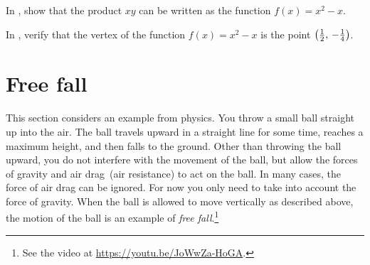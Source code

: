 \documentclass[a4paper,oneside,12pt]{article}
\begin{document}

\begin{exercise}
In , show that the product $xy$ can be
written as the function $f(x) = x^2 - x$.
\end{exercise}


\begin{exercise}
In , verify that the vertex of the
function $f(x) = x^2 - x$ is the point
$\left\lparen{\frac{1}{2}},\, {-\frac{1}{4}}\right\rparen$.
\end{exercise}




\section{Free fall}

This section considers an example from physics.  You throw a small
ball straight up into the air.  The ball travels upward in a straight
line for some time, reaches a maximum height, and then falls to the
ground.  Other than throwing the ball upward, you do not interfere
with the movement of the ball, but allow the forces of gravity and air
drag~(air resistance) to act on the ball.  In many cases, the force of
air drag can be ignored.  For now you only need to take into account
the force of gravity.  When the ball is allowed to move vertically as
described above, the motion of the ball is an example of
\emph{free fall}.\footnote{
  See the video at
  \url{https://youtu.be/JoWwZa-HoGA}.
}
\end{document}
